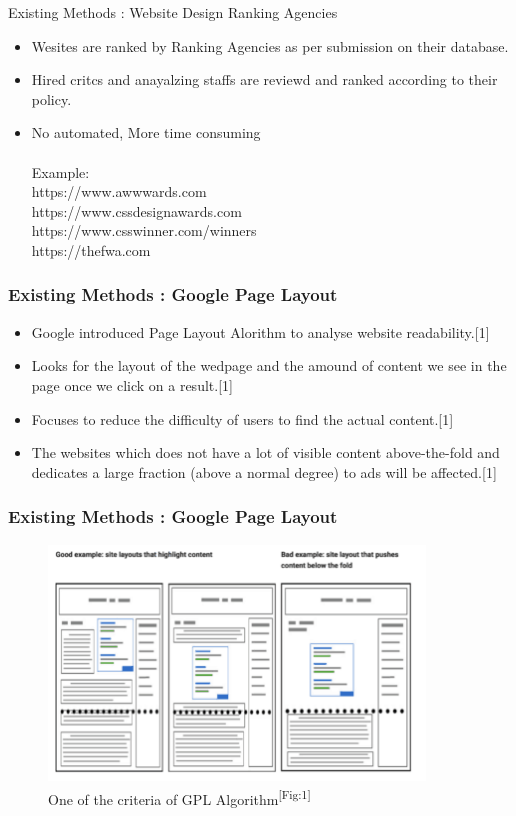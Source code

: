 \documentclass[11pt]{beamer}
\begin{document}
	\begin{frame}{Existing Methods : Website Design Ranking Agencies }
		\begin{itemize}
			\item Wesites are ranked by Ranking Agencies as per submission on their database.
			\item Hired critcs and anayalzing staffs are reviewd and ranked according to their policy.
			\item No automated, More time consuming\\\
			\\Example:\\
			https://www.awwwards.com\\

			https://www.cssdesignawards.com\\

			https://www.csswinner.com/winners\\

			https://thefwa.com\\
		\end{itemize}
	\end{frame}
	\begin{frame}
	\frametitle{{Existing Methods : Google Page Layout}}
	\begin{itemize}
		\item Google introduced Page Layout Alorithm to analyse website readability.[1]
		\item Looks for the layout of the wedpage and the amound of content we see in the page once we click on a result.[1]
		
		\item Focuses to reduce the difficulty of users to find the actual content.[1]
		
		\item  The websites which does not have a lot of visible content above-the-fold and dedicates a large fraction (above a normal degree) to ads will be affected.[1]
		
		
	\end{itemize}

	\end{frame}
\begin{frame}
	\frametitle{{Existing Methods : Google Page Layout}}
		\begin{figure}
		
		\includegraphics[width=10cm]{image/gpa.png}
		\caption{One of the criteria of GPL Algorithm\textsuperscript{[Fig:1]}}
		\label{fig1:gpa}
	\end{figure}
\end{frame}
\end{document}
